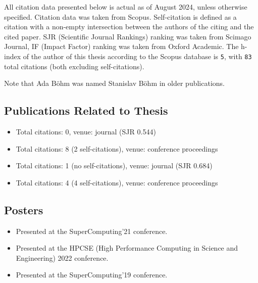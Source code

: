 All citation data presented below is actual as of August 2024, unless otherwise
specified. Citation data was taken from Scopus.
Self-citation is defined as a citation with a non-empty intersection between the authors of the citing and the cited paper.
SJR (Scientific Journal Rankings) ranking was taken from Scimago Journal,
IF (Impact Factor) ranking was taken from Oxford Academic.
The h-index of the author of this thesis according to the Scopus database is \texttt{5},
with \texttt{83} total citations (both excluding self-citations).

Note that Ada Böhm was named Stanislav Böhm in older publications.

\begin{refsection}
\renewcommand*{\mkbibnamegiven}[1]{%
	\ifitemannotation{highlight}
	{\textbf{#1}}
	{#1}}

\renewcommand*{\mkbibnamefamily}[1]{%
	\ifitemannotation{highlight}
	{\textbf{#1}}
	{#1}}

\section*{Publications Related to Thesis}
	\begin{itemize}
		\item{}\par{}Total citations: 0, venue: journal (SJR 0.544)
		\item{}\par{}Total citations: 8 (2 self-citations), venue: conference proceedings
		\item{}\par{}Total citations: 1 (no self-citations), venue: journal (SJR 0.684)
		\item{}\par{}Total citations: 4 (4 self-citations), venue: conference proceedings
	\end{itemize}

	\subsection*{Posters}
	\begin{itemize}
		\item{}\par{}Presented at the SuperComputing'21 conference.
		\item{}\par{}Presented at the HPCSE (High Performance
		Computing in Science and Engineering) 2022 conference.
		\item{}\par{}Presented at the SuperComputing'19 conference.
	\end{itemize}


\end{refsection}

